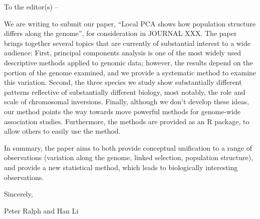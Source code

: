 To the editor(s) --

We are writing to submit our paper,
``Local PCA shows how population structure differs along the genome'',
for consideration in JOURNAL XXX.
The paper brings together several topics that are currently of substantial interest 
to a wide audience:
First, principal components analysis is one of the most widely used descriptive methods 
applied to genomic data;
however, the results depend on the portion of the genome examined, 
and we provide a systematic method to examine this variation.
Second, the three species we study show substantially different patterns
reflective of substantially different biology,
most notably, the role and scale of chromosomal inversions.
Finally,
although we don't develop these ideas,
our method points the way towards move powerful methods for genome-wide association studies.
Furthermore,
the methods are provided as an R package,
to allow others to easily use the method.

In summary, the paper aims to both
provide conceptual unification to a range of observations
(variation along the genome, linked selection, population structure),
and provide a new statistical method,
which leads to biologically interesting observations.


Sincerely,

 Peter Ralph and Han Li

